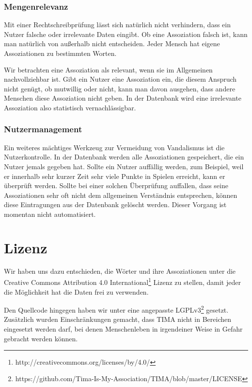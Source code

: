 \subsubsection{Mengenrelevanz}
Mit einer Rechtschreibprüfung lässt sich natürlich nicht verhindern, dass ein
Nutzer falsche oder irrelevante Daten eingibt. Ob eine Assoziation falsch ist,
kann man natürlich von außerhalb nicht entscheiden. Jeder Mensch hat eigene
Assoziationen zu bestimmten Worten.

Wir betrachten eine Assoziation als relevant, wenn sie im Allgemeinen
nachvollziehbar ist. Gibt ein Nutzer eine Assoziation ein, die diesem
Anspruch nicht genügt, ob mutwillig oder nicht, kann man davon ausgehen, dass
andere Menschen diese Assoziation nicht geben. In der Datenbank wird eine
irrelevante Assoziation also statistisch vernachlässigbar.

\subsubsection{Nutzermanagement}
Ein weiteres mächtiges Werkzeug zur Vermeidung von Vandalismus ist die
Nutzerkontrolle. In der Datenbank werden alle Assoziationen gespeichert, die
ein Nutzer jemals gegeben hat. Sollte ein Nutzer auffällig werden, zum
Beispiel, weil er innerhalb sehr kurzer Zeit sehr viele Punkte in Spielen
erreicht, kann er überprüft werden. Sollte bei einer solchen Überprüfung
auffallen, dass seine Assoziationen sehr oft nicht dem allgemeinen Verständnis
entsprechen, können diese Eintragungen aus der Datenbank gelöscht werden.
Dieser Vorgang ist momentan nicht automatisiert.

\section{Lizenz}
Wir haben uns dazu entschieden, die Wörter und ihre Assoziationen unter die Creative Commons Attribution 4.0 International\footnote{http://creativecommons.org/licenses/by/4.0/} Lizenz zu stellen, damit jeder die Möglichkeit hat die Daten frei zu verwenden.

Den Quellcode hingegen haben wir unter eine angepasste LGPLv3\footnote{https://github.com/Tima-Is-My-Association/TIMA/blob/master/LICENSE} gesetzt. Zusätzlich wurden Einschränkungen gemacht, dass TIMA nicht in Bereichen eingesetzt werden darf, bei denen Menschenleben in irgendeiner Weise in Gefahr gebracht werden können.
